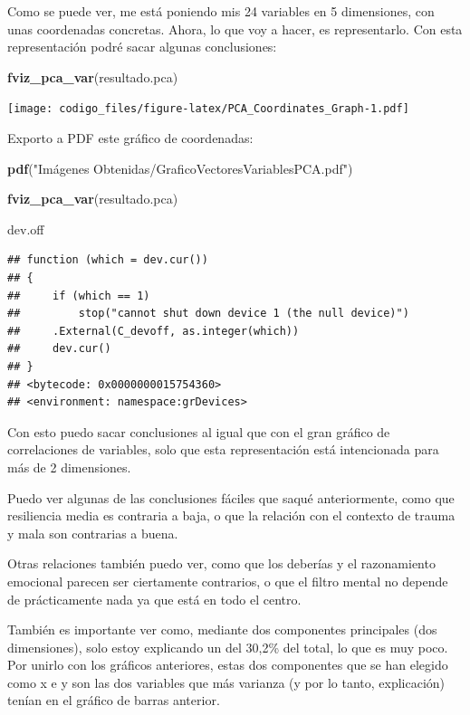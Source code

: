 \documentclass[]{article}
\newenvironment{Shaded}{\begin{snugshade}}{\end{snugshade}}
\newcommand{\KeywordTok}[1]{\textcolor[rgb]{0.13,0.29,0.53}{\textbf{#1}}}
\newcommand{\StringTok}[1]{\textcolor[rgb]{0.31,0.60,0.02}{#1}}
\newcommand{\NormalTok}[1]{#1}
\begin{document}
Como se puede ver, me está poniendo mis 24 variables en 5 dimensiones,
con unas coordenadas concretas. Ahora, lo que voy a hacer, es
representarlo. Con esta representación podré sacar algunas conclusiones:

\begin{Shaded}
\begin{Highlighting}[]
\KeywordTok{fviz_pca_var}\NormalTok{(resultado.pca)}
\end{Highlighting}
\end{Shaded}

\texttt{[image: codigo\_files/figure-latex/PCA\_Coordinates\_Graph-1.pdf]}

Exporto a PDF este gráfico de coordenadas:

\begin{Shaded}
\begin{Highlighting}[]
\KeywordTok{pdf}\NormalTok{(}\StringTok{"Imágenes Obtenidas/GraficoVectoresVariablesPCA.pdf"}\NormalTok{)}

\KeywordTok{fviz_pca_var}\NormalTok{(resultado.pca)}

\NormalTok{dev.off}
\end{Highlighting}
\end{Shaded}

\begin{verbatim}
## function (which = dev.cur()) 
## {
##     if (which == 1) 
##         stop("cannot shut down device 1 (the null device)")
##     .External(C_devoff, as.integer(which))
##     dev.cur()
## }
## <bytecode: 0x0000000015754360>
## <environment: namespace:grDevices>
\end{verbatim}

Con esto puedo sacar conclusiones al igual que con el gran gráfico de
correlaciones de variables, solo que esta representación está
intencionada para más de 2 dimensiones.

Puedo ver algunas de las conclusiones fáciles que saqué anteriormente,
como que resiliencia media es contraria a baja, o que la relación con el
contexto de trauma y mala son contrarias a buena.

Otras relaciones también puedo ver, como que los deberías y el
razonamiento emocional parecen ser ciertamente contrarios, o que el
filtro mental no depende de prácticamente nada ya que está en todo el
centro.

También es importante ver como, mediante dos componentes principales
(dos dimensiones), solo estoy explicando un del 30,2\% del total, lo que
es muy poco. Por unirlo con los gráficos anteriores, estas dos
componentes que se han elegido como x e y son las dos variables que más
varianza (y por lo tanto, explicación) tenían en el gráfico de barras
anterior.
\end{document}
